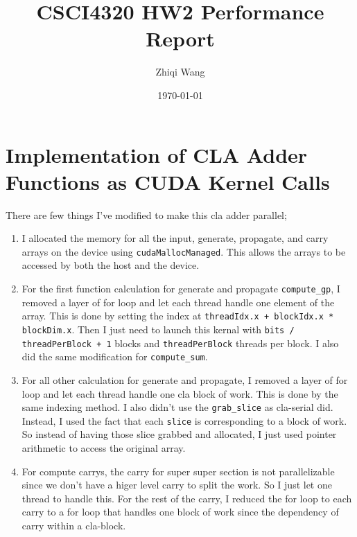 \documentclass[11pt]{article}
\title{\vspace{-3cm}CSCI4320 HW2 Performance Report}
\author{\vspace{-1cm}Zhiqi Wang}
\date{\today}
\begin{document}
\maketitle

\section{Implementation of CLA Adder Functions as CUDA Kernel Calls}

There are few things I've modified to make this cla adder parallel;

\begin{enumerate}

\item I allocated the memory for all the input, generate, propagate, and carry arrays on the device using 
\texttt{cudaMallocManaged}. This allows the arrays to be accessed by both the host and the device.

\item For the first function calculation for generate and propagate \texttt{compute\_gp}, I removed a 
layer of for loop and let each thread handle one element of the array. This is done by setting the 
index at \texttt{threadIdx.x + blockIdx.x * blockDim.x}. Then I just need to launch this kernal with 
\texttt{bits / threadPerBlock + 1} blocks and \texttt{threadPerBlock} threads per block.
I also did the same modification for \texttt{compute\_sum}.

\item  For all other calculation for generate and propagate,
    I removed a layer of for loop and let each thread handle one cla block of work. This is done 
    by the same indexing method. I also didn't use the \texttt{grab\_slice} as cla-serial did. 
    Instead, I used the fact that each \texttt{slice} is corresponding to a block of work.
    So instead of having those slice grabbed and allocated, I just used pointer arithmetic to
    access the original array.

\item For compute carrys, the carry for super super section is not parallelizable since we don't have 
a higer level carry to split the work. So I just let one thread to handle this. For the rest of the
carry, I reduced the for loop to each carry to a for loop that handles one block of work since the 
dependency of carry within a cla-block.



\end{enumerate}
\end{document}
